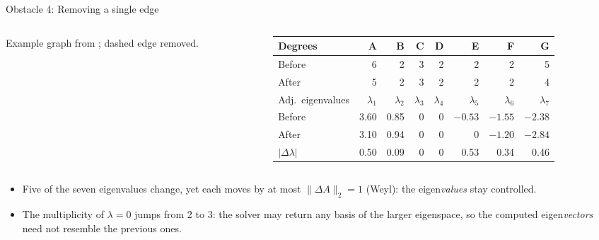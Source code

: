 \documentclass[aspectratio=169,11pt]{beamer}
\begin{document}
\begin{frame}{Obstacle 4: Removing a single edge}
  \begin{columns}[c]
    \begin{column}{0.3\textwidth}
      \centering

      \smallskip
      \scriptsize Example graph from \citet[Fig.~4]{liang2025centrality};
      dashed edge removed.
    \end{column}
    \begin{column}{0.66\textwidth}
      \centering
      \footnotesize
      \setlength{\tabcolsep}{4pt}
      \begin{tabular}{lrrrrrrr}
        \toprule
        Degrees & A & B & C & D & E & F & G \\
        \midrule
        Before & 6 & 2 & 3 & 2 & 2 & 2 & 5 \\
        After  & \alert{5} & 2 & 3 & 2 & 2 & 2 & \alert{4} \\
        \midrule
        Adj.\ eigenvalues & $\lambda_1$ & $\lambda_2$ & $\lambda_3$ & $\lambda_4$ & $\lambda_5$ & $\lambda_6$ & $\lambda_7$ \\
        \midrule
        Before & 3.60 & 0.85 & 0 & 0 & $-0.53$ & $-1.55$ & $-2.38$ \\
        After  & \alert{3.10} & \alert{0.94} & 0 & 0 & \alert{0} & \alert{$-1.20$} & \alert{$-2.84$} \\
        $|\Delta\lambda|$ & 0.50 & 0.09 & 0 & 0 & 0.53 & 0.34 & 0.46 \\
        \bottomrule
      \end{tabular}
    \end{column}
  \end{columns}

  \bigskip
  \begin{itemize}
    \item Five of the seven eigenvalues change, yet each moves by at most
          $\|\Delta A\|_2 = 1$ (Weyl): the eigen\emph{values} stay controlled.
    \item The multiplicity of $\lambda = 0$ jumps from 2 to \alert{3}: the solver may
          return any basis of the larger eigenspace, so the computed
          eigen\emph{vectors} need not resemble the previous ones.
  \end{itemize}
\end{frame}
\end{document}
